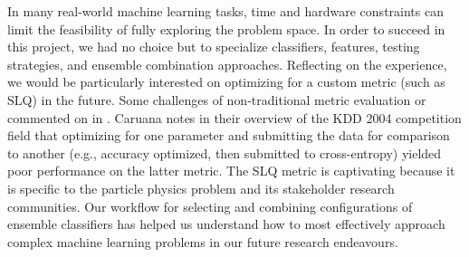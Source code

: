 \documentclass{article}
\begin{document}
In many real-world machine learning tasks, time and hardware constraints can limit the feasibility of fully exploring the problem space.
In order to succeed in this project, we had no choice but to specialize classifiers, features, testing strategies, and ensemble combination approaches.
Reflecting on the experience, we would be particularly interested on optimizing for a custom metric (such as SLQ) in the future.
Some challenges of non-traditional metric evaluation or commented on in \cite{vogel2004anti}.
Caruana notes in their overview of the KDD 2004 competition field \cite{caruana2004kdd} that optimizing for one parameter and submitting the data for comparison to another (e.g., accuracy optimized, then submitted to cross-entropy) yielded poor performance on the latter metric. 
The SLQ metric is captivating because it is specific to the particle physics problem and its stakeholder research communities. 
Our workflow for selecting and combining configurations of ensemble classifiers has helped us understand how to most effectively approach complex machine learning problems in our future research endeavours.




\end{document}
